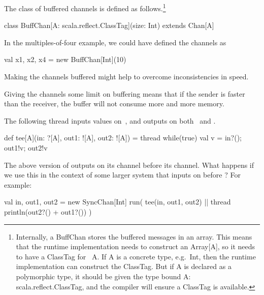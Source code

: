 \documentclass[notes,color]{sepslide0}
\begin{document}

\begin{slide}

The class of buffered channels is defined as follows.\footnote{Internally, a
  {\scalashape BuffChan} stores the buffered messages in an array.  This means
  that the runtime implementation needs to construct an {\scalashape
    Array[A]}, so it needs to have a {\scalashape ClassTag} for~{\scalashape
    A}.  If {\scalashape A} is a concrete type, e.g.~{\scalashape Int}, then
  the runtime implementation can construct the {\scalashape ClassTag}.  But if
  {\scalashape A} is declared as a polymorphic type, it should be given the
  type bound {\scalashape A: scala.reflect.ClassTag}, and the compiler will
  ensure a {\scalashape ClassTag} is available.}
%
\begin{scala}
class BuffChan[A: scala.reflect.ClassTag](size: Int) extends Chan[A]
\end{scala}


\vfill
\end{slide}


\begin{slide}

In the multiples-of-four example, we could have defined the channels as 
%
\begin{scala}
  val x1, x2, x4 = new BuffChan[Int](10)
\end{scala}

Making the channels buffered might help to overcome inconsistencies in speed. 

Giving the channels some limit on buffering means that if the sender is faster
than the receiver, the buffer will not consume more and more memory.  
\end{slide}



\begin{slide}

The following thread inputs values on~, and outputs on
both~ and .
%
\begin{scala}
def tee[A](in: ?[A], out1: ![A], out2: ![A]) = thread{
  while(true){ val v = in?(); out1!v; out2!v }
}
\end{scala}

The above version of  outputs on its  channel before
its  channel.  What happens if we use this in the context of some
larger system that inputs on  before ?  For example:
\begin{scala}
val in, out1, out2 = new SyncChan[Int]
run( tee(in, out1, out2) || thread{ println(out2?() + out1?()) } )
\end{scala}
\end{slide}
\end{document}
